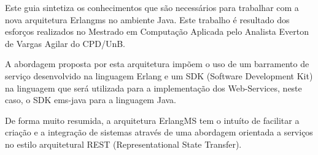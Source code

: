 Este guia sintetiza os conhecimentos que são necessários para trabalhar com a nova arquitetura 
Erlangms no ambiente Java. Este trabalho é resultado dos esforços realizados no Mestrado em Computação 
Aplicada pelo Analista Everton de Vargas Agilar do CPD/UnB.

A abordagem proposta por esta arquitetura
impõem o uso de um barramento de serviço desenvolvido na 
linguagem Erlang e um SDK (Software Development Kit) na linguagem 
que será utilizada para a implementação dos Web-Services, neste caso, o SDK ems-java 
para a linguagem Java. 

De forma muito resumida, a arquitetura ErlangMS tem o intuíto de facilitar a 
criação e a integração de sistemas através de uma abordagem
orientada a serviços no estilo arquitetural REST (Representational State Transfer). 

